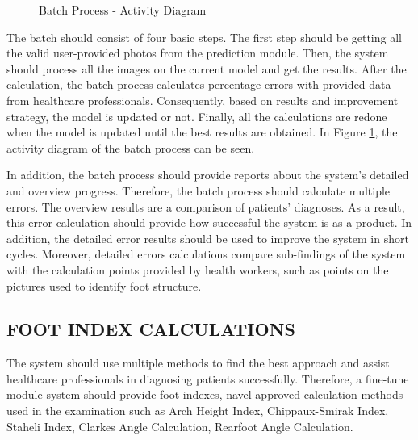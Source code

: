 \begin{figure}[htbp]
\centering
{}
\caption{Batch Process - Activity Diagram}
\label{fig:BatchProcessActivityDiagram}
\end{figure}

The batch should consist of four basic steps. The first step should be getting all the valid user-provided photos from the prediction module. Then, the system should process all the images on the current model and get the results. After the calculation, the batch process calculates percentage errors with provided data from healthcare professionals. Consequently, based on results and improvement strategy, the model is updated or not. Finally, all the calculations are redone when the model is updated until the best results are obtained. In Figure \ref{fig:BatchProcessActivityDiagram}, the activity diagram of the batch process can be seen.

In addition, the batch process should provide reports about the system's detailed and overview progress. Therefore, the batch process should calculate multiple errors. The overview results are a comparison of patients' diagnoses. As a result, this error calculation should provide how successful the system is as a product. In addition, the detailed error results should be used to improve the system in short cycles. Moreover, detailed errors calculations compare sub-findings of the system with the calculation points provided by health workers, such as points on the pictures used to identify foot structure. 

\subsection{ FOOT INDEX CALCULATIONS }

The system should use multiple methods to find the best approach and assist healthcare professionals in diagnosing patients successfully. Therefore, a fine-tune module system should provide foot indexes, navel-approved calculation methods used in the examination such as Arch Height Index, Chippaux-Smirak Index, Staheli Index, Clarkes Angle Calculation, Rearfoot Angle Calculation. 

